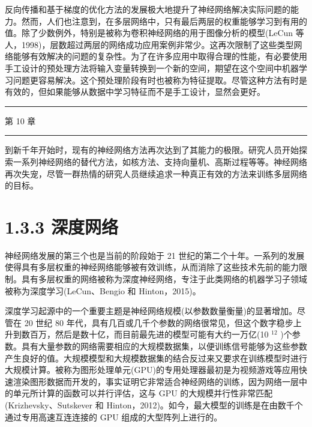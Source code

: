 \documentclass[10pt]{article}
\newcommand{\HRule}{\begin{center}\rule{0.9\linewidth}{0.2mm}\end{center}}
\begin{document}
反向传播和基于梯度的优化方法的发展极大地提升了神经网络解决实际问题的能力。然而，人们也注意到，在多层网络中，只有最后两层的权重能够学习到有用的值。除了少数例外，特别是被称为卷积神经网络的用于图像分析的模型(LeCun 等人，1998)，层数超过两层的网络成功应用案例非常少。这再次限制了这些类型网络能够有效解决的问题的复杂性。为了在许多应用中取得合理的性能，有必要使用手工设计的预处理方法将输入变量转换到一个新的空间，期望在这个空间中机器学习问题更容易解决。这个预处理阶段有时也被称为特征提取。尽管这种方法有时是有效的，但如果能够从数据中学习特征而不是手工设计，显然会更好。

\HRule

第 10 章

\HRule

到新千年开始时，现有的神经网络方法再次达到了其能力的极限。研究人员开始探索一系列神经网络的替代方法，如核方法、支持向量机、高斯过程等等。神经网络再次失宠，尽管一群热情的研究人员继续追求一种真正有效的方法来训练多层网络的目标。

\section*{1.3.3 深度网络}

神经网络发展的第三个也是当前的阶段始于 21 世纪的第二个十年。一系列的发展使得具有多层权重的神经网络能够被有效训练，从而消除了这些技术先前的能力限制。具有多层权重的网络被称为深度神经网络，专注于此类网络的机器学习子领域被称为深度学习(LeCun、Bengio 和 Hinton，2015)。

深度学习起源中的一个重要主题是神经网络规模(以参数数量衡量)的显著增加。尽管在 20 世纪 80 年代，具有几百或几千个参数的网络很常见，但这个数字稳步上升到数百万，然后是数十亿，而目前最先进的模型可能有大约一万亿(10 \({}^{12}\) )个参数。具有大量参数的网络需要相应的大规模数据集，以便训练信号能够为这些参数产生良好的值。大规模模型和大规模数据集的结合反过来又要求在训练模型时进行大规模计算。被称为图形处理单元(GPU)的专用处理器最初是为视频游戏等应用快速渲染图形数据而开发的，事实证明它非常适合神经网络的训练，因为网络一层中的单元所计算的函数可以并行评估，这与 GPU 的大规模并行性非常匹配(Krizhevsky、Sutskever 和 Hinton，2012)。如今，最大模型的训练是在由数千个通过专用高速互连连接的 GPU 组成的大型阵列上进行的。
\end{document}
